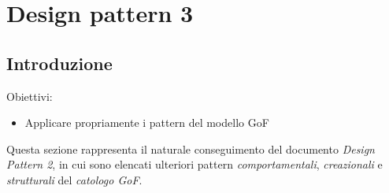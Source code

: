 \documentclass{article}
\begin{document}
\pagestyle{empty}
\section*{Design pattern 3}
\large

\subsection*{Introduzione}
\large
Obiettivi:
\begin{itemize}
    \renewcommand{\labelitemi}{-}
    \itemsep0em
    \item Applicare propriamente i pattern del modello GoF 
\end{itemize}
Questa sezione rappresenta il naturale conseguimento del documento \textit{Design Pattern 2}, in cui sono elencati ulteriori pattern \textit{comportamentali}, \textit{creazionali} e \textit{strutturali} del \textit{catologo GoF}.
\end{document}
